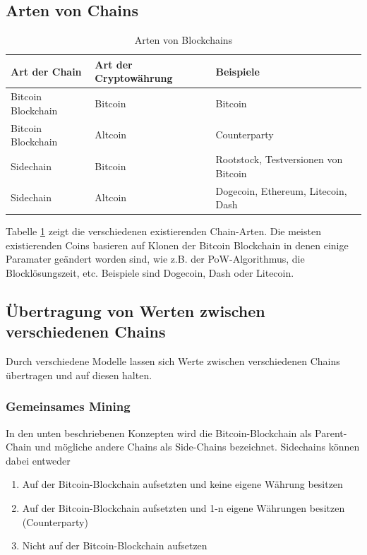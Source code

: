 \subsection{Arten von Chains}
\begin{table}[]
	\centering
	\caption{Arten von Blockchains}
	\label{chain-arten}
	\begin{tabular}{lll}
		\hline
		\textbf{Art der Chain} & \textbf{Art der Cryptowährung} & \textbf{Beispiele}                 \\ \hline
		Bitcoin Blockchain     & Bitcoin                        & Bitcoin                            \\
		Bitcoin Blockchain     & Altcoin                        & Counterparty                       \\
		Sidechain      & Bitcoin                        & Rootstock, Testversionen von Bitcoin  \\
		Sidechain      & Altcoin                        & Dogecoin, Ethereum, Litecoin, Dash \\ \hline
	\end{tabular}
\end{table}

Tabelle \ref{chain-arten} zeigt die verschiedenen existierenden Chain-Arten. Die meisten existierenden Coins basieren auf Klonen der Bitcoin Blockchain in denen einige Paramater geändert worden sind, wie z.B. der PoW-Algorithmus, die Blocklösungszeit, etc. Beispiele sind Dogecoin, Dash oder Litecoin. 

\subsection{Übertragung von Werten zwischen verschiedenen Chains}
Durch verschiedene Modelle lassen sich Werte zwischen verschiedenen Chains übertragen und auf diesen halten. %


\subsubsection{Gemeinsames Mining}
In den unten beschriebenen Konzepten wird die Bitcoin-Blockchain als Parent-Chain und mögliche andere Chains als Side-Chains bezeichnet. Sidechains können dabei entweder 
\begin{enumerate}
	\item Auf der Bitcoin-Blockchain aufsetzten und keine eigene Währung besitzen
	\item Auf der Bitcoin-Blockchain aufsetzten und 1-n eigene Währungen besitzen (Counterparty)
	\item Nicht auf der Bitcoin-Blockchain aufsetzen
\end{enumerate}

